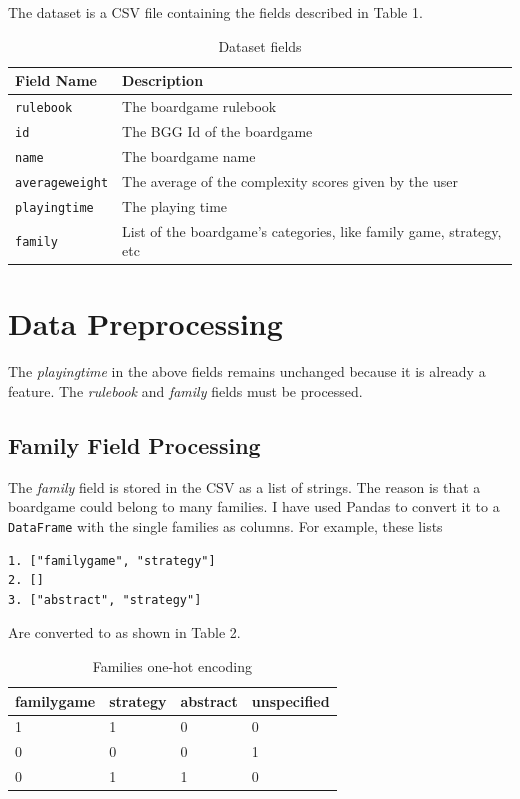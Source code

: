 \documentclass[runningheads]{llncs}
\begin{document}
\noindent The dataset is a CSV file containing the fields described in Table 1.

\begin{table}
\caption{Dataset fields}\label{tab1}
\begin{tabular}{|l|l|}
\hline
Field Name & Description\\
\hline
\verb|rulebook| & The boardgame rulebook \\
\verb|id| & The BGG Id of the boardgame \\
\verb|name| & The boardgame name \\
\verb|averageweight| & The average of the complexity scores given by the user \\
\verb|playingtime| & The playing time \\
\verb|family| & List of the boardgame's categories, like family game, strategy, etc \\
\hline
\end{tabular}
\end{table}

\section{Data Preprocessing}
The \textit{playingtime} in the above fields remains unchanged because it is already a feature. The \textit{rulebook} and \textit{family} fields must be processed.

\subsection{Family Field Processing}
The \textit{family} field is stored in the CSV as a list of strings. The reason is that a boardgame could belong to many families. I have used Pandas to convert it to a \verb|DataFrame| with the single families as columns. For example, these lists

\begin{verbatim}
1. ["familygame", "strategy"]
2. []
3. ["abstract", "strategy"]
\end{verbatim}

\noindent Are converted to as shown in Table 2.

\begin{table}
\caption{Families one-hot encoding}\label{tab2}
\begin{tabular}{|l|l|l|l|}
\hline
familygame & strategy & abstract & unspecified\\
\hline
1 & 1 & 0 & 0 \\
0 & 0 & 0 & 1 \\
0 & 1 & 1 & 0 \\
\hline
\end{tabular}
\end{table}
\end{document}

